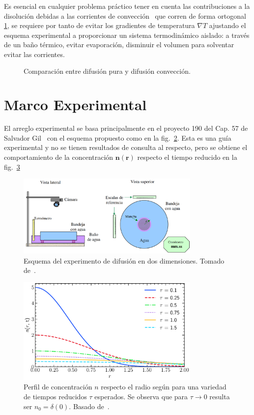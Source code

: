 \documentclass[11pt]{article}
\begin{document}
Es esencial en cualquier problema práctico tener en cuenta las contribuciones a la disolución debidas a las corrientes de convección~\cite{Cussler_2009} que corren de forma ortogonal \ref{fig:dif_vs_conv}, se requiere por tanto de evitar los gradientes de temperatura $\nabla T$ ajustando el esquema experimental a proporcionar un sistema termodinámico aislado: a través de un baño térmico, evitar evaporación, disminuir el volumen para solventar evitar las corrientes. 
\begin{figure}[htp]
    \centering
    
    \caption{Comparación entre difusión pura y difusión convección.}
    \label{fig:dif_vs_conv}
\end{figure}
\section*{Marco Experimental}
El arreglo experimental se basa principalmente en el proyecto 190 del Cap. 57 de Salvador Gil~\cite{gilExperimentosFisicaUsando2014} con el esquema propuesto como en la fig.~\ref{fig:esquema_experimental}. Esta es una guía experimental y no se tienen resultados de consulta al respecto, pero se obtiene el comportamiento de la concentración $\mathbf{n(r)}$ respecto el tiempo reducido en la fig.~\ref{fig:Arr1_n_vs_r}
\begin{figure}[htp]
    \centering
    \includegraphics[width=0.8\textwidth]{figs/esquema_refGil.png}
\caption{Esquema del experimento de difusión en dos dimensiones. Tomado de~\cite{gilExperimentosFisicaUsando2014}.}\label{fig:esquema_experimental}
\end{figure}
\begin{figure}[htp]
    \centering
    \includegraphics[width=0.8\textwidth]{figs/n(r,t)_vs_r.pdf}
    \caption{Perfil de concentración $n$ respecto el radio según para una variedad de tiempos reducidos $\tau$ esperados. Se observa que para $\tau\to 0$ resulta ser $n_0 = \delta(0)$. Basado de~\cite{gilExperimentosFisicaUsando2014}.}
    \label{fig:Arr1_n_vs_r}
\end{figure}
\end{document}
